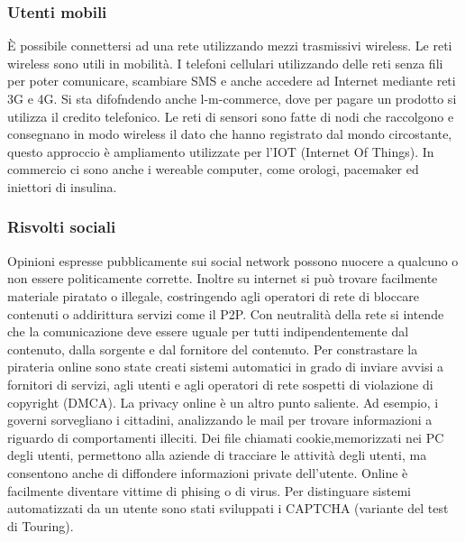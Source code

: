 \documentclass{article}
\begin{document}
			\subsubsection{Utenti mobili}
			È possibile connettersi ad una rete utilizzando mezzi trasmissivi wireless.
			Le reti wireless sono utili in mobilità.
			I telefoni cellulari utilizzando delle reti senza fili per poter comunicare, scambiare SMS e anche accedere ad Internet mediante reti 3G e 4G.
			Si sta difofndendo anche l-m-commerce, dove per pagare un prodotto si utilizza il credito telefonico.
			Le reti di sensori sono fatte di nodi che raccolgono e consegnano in modo wireless il dato che hanno registrato dal mondo circostante, questo approccio è ampliamento utilizzate per l'IOT (Internet Of Things).
			In commercio ci sono anche i wereable computer, come orologi, pacemaker ed iniettori di insulina.
			\subsubsection{Risvolti sociali}
			Opinioni espresse pubblicamente sui social network possono nuocere a qualcuno o non essere politicamente corrette. Inoltre su internet si può trovare facilmente materiale piratato o illegale, costringendo agli operatori di rete di bloccare contenuti o addirittura servizi come il P2P.
			Con neutralità della rete si intende che la comunicazione deve essere uguale per tutti indipendentemente dal contenuto, dalla sorgente e dal fornitore del contenuto.
			Per constrastare la pirateria online sono state creati sistemi automatici in grado di inviare avvisi a fornitori di servizi, agli utenti e agli operatori di rete sospetti di violazione di copyright (DMCA).
			La privacy online è un altro punto saliente. Ad esempio, i governi sorvegliano i cittadini, analizzando le mail per trovare informazioni a riguardo di comportamenti illeciti.
			Dei file chiamati cookie,memorizzati nei PC degli utenti, permettono alla aziende di tracciare le attività degli utenti, ma consentono anche di diffondere informazioni private dell'utente.
			Online è facilmente diventare vittime di phising o di virus.
			Per distinguare sistemi automatizzati da un utente sono stati sviluppati i CAPTCHA (variante del test di Touring).
\end{document}
